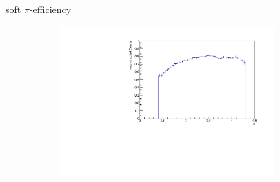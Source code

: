 \documentclass[11pt]{beamer}
\begin{document}
\begin{frame}{soft $\pi$-efficiency}
\begin{figure}
\begin{subfigure}{0.45\textwidth}
\end{subfigure}
\begin{subfigure}{0.45\textwidth}
\includegraphics[width=0.9\textwidth]{up_pdf/pos/h_eta_reco_SPi_pos.pdf}
\end{subfigure}
\end{figure}
\end{frame}
\end{document}
